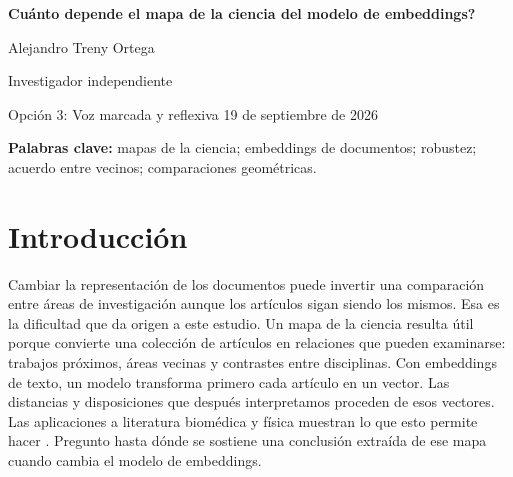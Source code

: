 \documentclass[12pt]{article}
\begin{document}
\begin{center}
{\LARGE\bfseries \textquestiondown{}Cuánto depende el mapa de la ciencia del modelo de embeddings?\par}
\vspace{12pt}
{\large Alejandro Treny Ortega\par}
\smallskip
Investigador independiente\par
\medskip
{\small Opción 3: Voz marcada y reflexiva \textbullet{} 19 de septiembre de 2026\par}
\end{center}

\begin{abstract}
Una comparación entre áreas puede resistir la selección repetida de artículos e invertirse al cambiar de modelo de embeddings. Este estudio examina ese problema con diez modelos y un corpus fijo de 500.000 registros de OpenAlex, de 26 áreas y del período 2000--2024. Las muestras emparejadas comparan centros de áreas, relaciones internas y vecinos próximos, con controles del texto de entrada y de las reglas de representación. Los modelos comparten una estructura general, pero conservan de media solo el 30,3\% de los 25 vecinos más próximos dentro de los grupos de área y período. Quitar el resumen cambia los vecinos casi tanto como cambiar de modelo; quitar el título cambia menos. Un análisis exploratorio posterior examina las 325 parejas de áreas. Hay órdenes opuestos persistentes entre modelos en 262 parejas para la apertura angular y 221 para la dimensión lineal efectiva; al exigir diferencias relativas superiores al 5\%, quedan 96 y 177. Las medidas alternativas conservan muchas oposiciones, aunque el centrado y la combinación de las salidas afectan a las conclusiones. Los resultados describen dependencia geométrica, sin establecer corrección temática. Propongo seguir una afirmación a través de las decisiones que producen su mapa. Repetir un resultado al seleccionar artículos responde a una pregunta útil, pero no demuestra que otra representación de esos mismos artículos sostenga la misma interpretación.
\end{abstract}
\textbf{Palabras clave:} mapas de la ciencia; embeddings de documentos; robustez; acuerdo entre vecinos; comparaciones geométricas.

\section{Introducción}
Cambiar la representación de los documentos puede invertir una comparación entre áreas de investigación aunque los artículos sigan siendo los mismos. Esa es la dificultad que da origen a este estudio. Un mapa de la ciencia resulta útil porque convierte una colección de artículos en relaciones que pueden examinarse: trabajos próximos, áreas vecinas y contrastes entre disciplinas. Con embeddings de texto, un modelo transforma primero cada artículo en un vector. Las distancias y disposiciones que después interpretamos proceden de esos vectores. Las aplicaciones a literatura biomédica y física muestran lo que esto permite hacer \citep{refbe130e2973,refc0e2cc29e0}. Pregunto hasta dónde se sostiene una conclusión extraída de ese mapa cuando cambia el modelo de embeddings.
\end{document}

